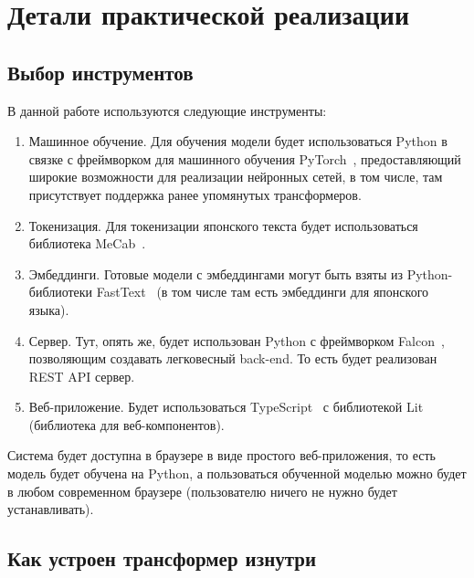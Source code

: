 

\chapter{Детали практической реализации}


\section{Выбор инструментов}


В данной работе используются следующие инструменты:
\begin{enumerate}[1.]%
  \item Машинное обучение. Для обучения модели будет использоваться Python в связке с фреймворком для машинного обучения PyTorch~\cite{PyTorch}, предоставляющий широкие возможности для реализации нейронных сетей, в том числе, там присутствует поддержка ранее упомянутых трансформеров.
  \item Токенизация. Для токенизации японского текста будет использоваться библиотека MeCab~\cite{MeCab}.
  \item Эмбеддинги. Готовые модели с эмбеддингами могут быть взяты из Python-библиотеки FastText~\cite{FastText} (в том числе там есть эмбеддинги для японского языка).
  \item Сервер. Тут, опять же, будет использован Python с фреймворком Falcon~\cite{Falcon}, позволяющим создавать легковесный back-end. То есть будет реализован REST API сервер.
  \item Веб-приложение. Будет использоваться TypeScript~\cite{TypeScript} с библиотекой Lit~\cite{Lit} (библиотека для веб-компонентов).
\end{enumerate}

Система будет доступна в браузере в виде простого веб-приложения, то есть модель будет обучена на Python, а пользоваться обученной моделью можно будет в любом современном браузере (пользователю ничего не нужно будет устанавливать).


\section{Как устроен трансформер изнутри}


